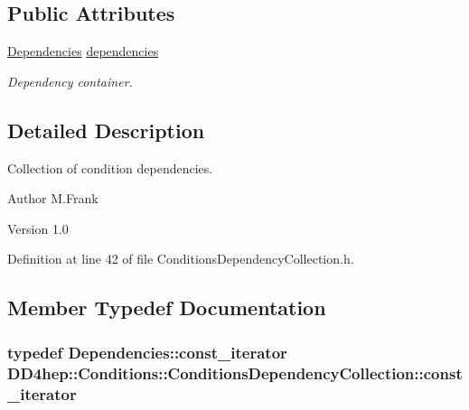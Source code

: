 \subsection*{Public Attributes}
\begin{DoxyCompactItemize}
\item 
\hyperlink{class_d_d4hep_1_1_conditions_1_1_conditions_dependency_collection_a7fb4072b6036f59389b929e312e2679c}{Dependencies} \hyperlink{class_d_d4hep_1_1_conditions_1_1_conditions_dependency_collection_aec9ef437ecf9857dbbda3f494be276b9}{dependencies}
\begin{DoxyCompactList}\small\item\em Dependency container. \item\end{DoxyCompactList}\end{DoxyCompactItemize}


\subsection{Detailed Description}
Collection of condition dependencies. \begin{DoxyAuthor}{Author}
M.Frank 
\end{DoxyAuthor}
\begin{DoxyVersion}{Version}
1.0 
\end{DoxyVersion}


Definition at line 42 of file ConditionsDependencyCollection.h.

\subsection{Member Typedef Documentation}
\hypertarget{class_d_d4hep_1_1_conditions_1_1_conditions_dependency_collection_ab5e9bcdc3330c3b694303f627799dc84}{
\subsubsection[{const\_\-iterator}]{\setlength{\rightskip}{0pt plus 5cm}typedef Dependencies::const\_\-iterator {\bf DD4hep::Conditions::ConditionsDependencyCollection::const\_\-iterator}}}
\label{class_d_d4hep_1_1_conditions_1_1_conditions_dependency_collection_ab5e9bcdc3330c3b694303f627799dc84}



